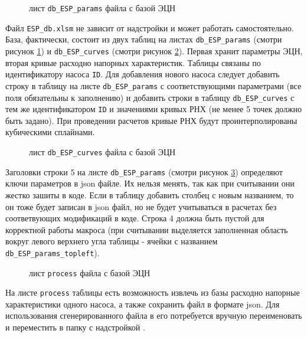 \begin{figure}[h!]
	\caption{лист \texttt{db_ESP_params} файла с базой ЭЦН}
	\label{ris:ESP_db_1}
\end{figure}

Файл \texttt{ESP_db.xlsm} не зависит от надстройки \unf{} и может работать самостоятельно. База, фактически, состоит из двух таблиц на листах \texttt{db_ESP_params} (смотри рисунок \ref{ris:ESP_db_1})  и \texttt{db_ESP_curves} (смотри  рисунок \ref{ris:ESP_db_2}). Первая хранит параметры ЭЦН, вторая кривые расходно напорных характеристик. Таблицы связаны по идентификатору насоса \texttt{ID}. Для добавления нового насоса следует добавить строку в таблицу на листе \texttt{db_ESP_params} с соответствующими параметрами (все поля обязательны к заполнению) и добавить строки в таблицу \texttt{db_ESP_curves} с тем же идентификатором \texttt{ID} и значениями кривых РНХ (не менее 5 точек должно быть задано). При проведении расчетов кривые РНХ будут проинтерполированы кубическими сплайнами.  

\begin{figure}[h!]
	\caption{лист \texttt{db_ESP_curves} файла с базой ЭЦН}
	\label{ris:ESP_db_2}
\end{figure}

Заголовки строки 5 на листе \texttt{db_ESP_params} (смотри  рисунок \ref{ris:ESP_db_3}) определяют ключи параметров в json файле. Их нельзя менять, так как при считывании они жестко зашиты в коде. Если в таблицу добавить столбец с новым названием, то он тоже будет записан в json файл, но не будет учитываться в расчетах без соответвующих модификаций в коде. Строка 4 должна быть пустой для корректной работы макроса (при считывании выделяется заполненная область вокруг левого верхнего угла таблицы - ячейки с названием \texttt{db_ESP_params_topleft}).

\begin{figure}[h!]
	\caption{лист \texttt{process} файла с базой ЭЦН}
	\label{ris:ESP_db_3}
\end{figure}

На листе \texttt{process} таблицы есть возможность извлечь из базы расходно напорные характеристики одного насоса, а также сохранить файл в формате json. Для использования сгенерированного файла в \unf{} его потребуется вручную переименовать и переместить в папку с надстройкой \unf{}. 



